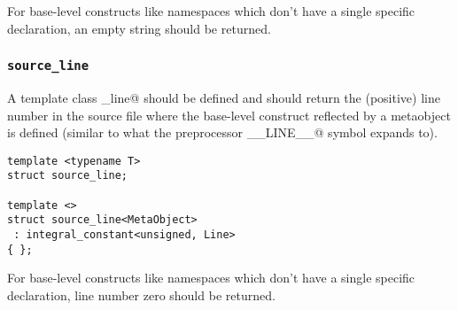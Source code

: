 For base-level constructs like namespaces which don't have a single specific
declaration, an empty string should be returned.

\subsubsection{\texttt{source\_line}}

A template class \verb@source_line@ should be defined and should return the (positive)
line number in the source file where the base-level construct reflected by a
metaobject is defined (similar to what the preprocessor \verb@__LINE__@ symbol
expands to).

\begin{verbatim}
template <typename T>
struct source_line;

template <>
struct source_line<MetaObject>
 : integral_constant<unsigned, Line>
{ };
\end{verbatim}

For base-level constructs like namespaces which don't have a single specific
declaration, line number zero should be returned.

